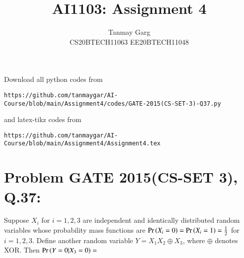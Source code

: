 \documentclass[journal,12pt,twocolumn]{IEEEtran}
\begin{document}
     \def\rightbox#1{\makebox[0in][r]{#1}}
     \def\centbox#1{\makebox[0in]{#1}}
     \def\topbox#1{\raisebox{-\baselineskip}[0in][0in]{#1}}
     \def\midbox#1{\raisebox{-0.5\baselineskip}[0in][0in]{#1}}
\vspace{3cm}
\title{AI1103: Assignment 4}
\author{Tanmay Garg \\CS20BTECH11063 EE20BTECH11048}
\maketitle
\newpage
\bigskip
\renewcommand{\thefigure}{\theenumi}
\renewcommand{\thetable}{\theenumi}
Download all python codes from 
\begin{lstlisting}
https://github.com/tanmaygar/AI-Course/blob/main/Assignment4/codes/GATE-2015(CS-SET-3)-Q37.py
\end{lstlisting}
%
and latex-tikz codes from 
%
\begin{lstlisting}
https://github.com/tanmaygar/AI-Course/blob/main/Assignment4/Assignment4.tex
\end{lstlisting}
\section*{Problem GATE 2015(CS-SET 3), Q.37: }
Suppose $X_i$ for $i = 1, 2, 3$ are independent
and identically distributed random variables
whose probability mass functions are
$\Pr\left(X_i = 0\right) = \Pr\left(X_i = 1\right) = \frac{1}{2}$ for $i = 1, 2, 3$.
Define another random variable $Y = X_1 X_2 \oplus X_3$, where $\oplus$ denotes XOR. Then $\Pr\left(Y = 0|X_3 = 0\right) =$
\end{document}
